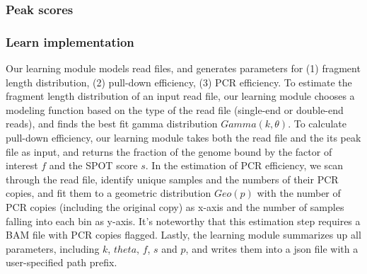 \documentclass[12pt]{article}
\begin{document}
\subsubsection*{Peak scores}


\subsubsection*{Learn implementation}

Our learning module models read files, and generates parameters for 
(1) fragment length distribution, (2) pull-down efficiency, (3) PCR efficiency.
To estimate the fragment length distribution of an input read file,
our learning module chooses a modeling function based on the type of the read file (single-end or double-end reads),
and finds the best fit gamma distribution $Gamma (k, \theta)$.
To calculate pull-down efficiency, our learning module takes both the read file and the its peak file as input,
and returns the fraction of the genome bound by the factor of interest $f$ and the SPOT score $s$.
In the estimation of PCR efficiency, we scan through the read file, 
identify unique samples and the numbers of their PCR copies,
and fit them to a geometric distribution $Geo(p)$ with the number of PCR copies (including the original copy)
as x-axis and the number of samples falling into each bin as y-axis.
It’s noteworthy that this estimation step requires a BAM file with PCR copies flagged. Lastly, the learning module summarizes up all parameters, including $k$, $theta$, $f$, $s$ and $p$, and writes them into a json file with a user-specified path prefix.
\end{document}

